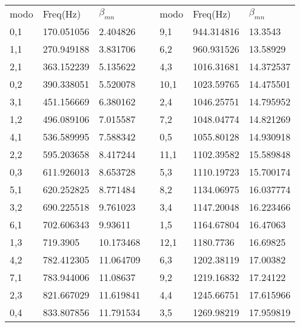 \documentclass[journal, a4paper,onecolumn]{IEEEtran}
\begin{document}
\begin{table}[H]
\centering
\begin{tabular}{l|l|lll|l|l}
modo & Freq(Hz)   & $\beta _{mn}$ &  & modo & Freq(Hz)   & $\beta _{mn}$ \\ \cline{1-3} \cline{5-7} 
0,1  & 170.051056 & 2.404826      &  & 9,1  & 944.314816 & 13.3543       \\ \cline{1-3} \cline{5-7} 
1,1  & 270.949188 & 3.831706      &  & 6,2  & 960.931526 & 13.58929      \\ \cline{1-3} \cline{5-7} 
2,1  & 363.152239 & 5.135622      &  & 4,3  & 1016.31681 & 14.372537     \\ \cline{1-3} \cline{5-7} 
0,2  & 390.338051 & 5.520078      &  & 10,1 & 1023.59765 & 14.475501     \\ \cline{1-3} \cline{5-7} 
3,1  & 451.156669 & 6.380162      &  & 2,4  & 1046.25751 & 14.795952     \\ \cline{1-3} \cline{5-7} 
1,2  & 496.089106 & 7.015587      &  & 7,2  & 1048.04774 & 14.821269     \\ \cline{1-3} \cline{5-7} 
4,1  & 536.589995 & 7.588342      &  & 0,5  & 1055.80128 & 14.930918     \\ \cline{1-3} \cline{5-7} 
2,2  & 595.203658 & 8.417244      &  & 11,1 & 1102.39582 & 15.589848     \\ \cline{1-3} \cline{6-7} 
0,3  & 611.926013 & 8.653728      &  & 5,3  & 1110.19723 & 15.700174     \\ \cline{1-3} \cline{5-7} 
5,1  & 620.252825 & 8.771484      &  & 8,2  & 1134.06975 & 16.037774     \\ \cline{1-3} \cline{5-7} 
3,2  & 690.225518 & 9.761023      &  & 3,4  & 1147.20048 & 16.223466     \\ \cline{1-3} \cline{5-7} 
6,1  & 702.606343 & 9.93611       &  & 1,5  & 1164.67804 & 16.47063      \\ \cline{1-3} \cline{5-7} 
1,3  & 719.3905   & 10.173468     &  & 12,1 & 1180.7736  & 16.69825      \\ \cline{1-3} \cline{5-7} 
4,2  & 782.412305 & 11.064709     &  & 6,3  & 1202.38119 & 17.00382      \\ \cline{1-3} \cline{5-7} 
7,1  & 783.944006 & 11.08637      &  & 9,2  & 1219.16832 & 17.24122      \\ \cline{1-3} \cline{5-7} 
2,3  & 821.667029 & 11.619841     &  & 4,4  & 1245.66751 & 17.615966     \\ \cline{1-3} \cline{5-7} 
0,4  & 833.807856 & 11.791534     &  & 3,5  & 1269.98219 & 17.959819     \\ \cline{1-3} \cline{5-7} 

\end{tabular}
\end{table}
\end{document}
